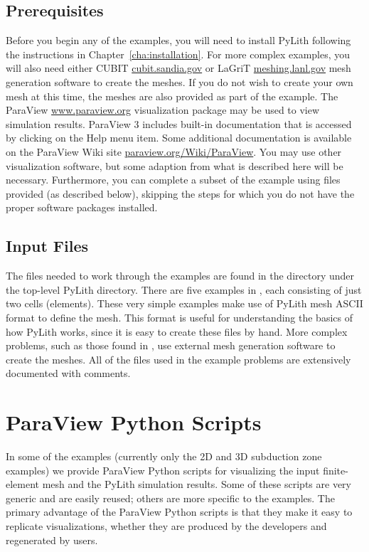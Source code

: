\subsection{Prerequisites}

Before you begin any of the examples, you will need to install PyLith
following the instructions in Chapter~\vref{cha:installation}.  For
more complex examples, you will also need either CUBIT
\url{cubit.sandia.gov} or LaGriT \url{meshing.lanl.gov} mesh
generation software to create the meshes. If you do not wish to create
your own mesh at this time, the meshes are also provided as part of
the example. The ParaView \url{www.paraview.org} visualization
package may be used to view simulation results. ParaView 3 includes
built-in documentation that is accessed by clicking on the Help menu
item. Some additional documentation is available on the ParaView Wiki
site \url{paraview.org/Wiki/ParaView}.  You may use other
visualization software, but some adaption from what is described here
will be necessary. Furthermore, you can complete a subset of the
example using files provided (as described below), skipping the steps
for which you do not have the proper software packages installed.


\subsection{Input Files}

The files needed to work through the examples are found in the
 directory under the top-level PyLith
directory. There are five examples in ,
each consisting of just two cells (elements).  These very simple
examples make use of PyLith mesh ASCII format to define the mesh. This
format is useful for understanding the basics of how PyLith works,
since it is easy to create these files by hand.  More complex
problems, such as those found in , use external
mesh generation software to create the meshes. All of the files used
in the example problems are extensively documented with comments.

\section{ParaView Python Scripts}
\label{sec:ParaView:Python:scripts}

In some of the examples (currently only the 2D and 3D subduction zone
examples) we provide ParaView Python scripts for visualizing the input
finite-element mesh and the PyLith simulation results. Some of these
scripts are very generic and are easily reused; others are more
specific to the examples. The primary advantage of the ParaView Python
scripts is that they make it easy to replicate visualizations, whether
they are produced by the developers and regenerated by users.

